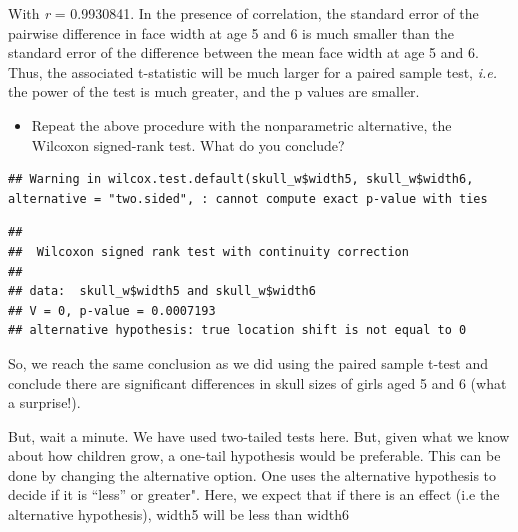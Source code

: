 \documentclass[
  12pt,
]{book}
\newenvironment{Shaded}{\begin{snugshade}}{\end{snugshade}}
\newcommand{\DataTypeTok}[1]{\textcolor[rgb]{0.13,0.29,0.53}{#1}}
\newcommand{\KeywordTok}[1]{\textcolor[rgb]{0.13,0.29,0.53}{\textbf{#1}}}
\newcommand{\NormalTok}[1]{#1}
\newcommand{\OperatorTok}[1]{\textcolor[rgb]{0.81,0.36,0.00}{\textbf{#1}}}
\newcommand{\OtherTok}[1]{\textcolor[rgb]{0.56,0.35,0.01}{#1}}
\newcommand{\StringTok}[1]{\textcolor[rgb]{0.31,0.60,0.02}{#1}}
\providecommand{\tightlist}{%
  \setlength{\itemsep}{0pt}\setlength{\parskip}{0pt}}
\begin{document}
With \emph{r} = 0.9930841. In the presence of correlation, the standard error of the pairwise difference in face width at age 5 and 6 is much smaller than the standard error of the difference between the mean face width at age 5 and 6. Thus, the associated t-statistic will be much larger for a paired sample test, \emph{i.e.} the power of the test is much greater, and the p values are smaller.

\begin{itemize}
\tightlist
\item
  Repeat the above procedure with the nonparametric alternative, the Wilcoxon signed-rank test. What do you conclude?
\end{itemize}

\begin{Shaded}
\end{Shaded}

\begin{verbatim}
## Warning in wilcox.test.default(skull_w$width5, skull_w$width6, alternative = "two.sided", : cannot compute exact p-value with ties
\end{verbatim}

\begin{verbatim}
## 
##  Wilcoxon signed rank test with continuity correction
## 
## data:  skull_w$width5 and skull_w$width6
## V = 0, p-value = 0.0007193
## alternative hypothesis: true location shift is not equal to 0
\end{verbatim}

So, we reach the same conclusion as we did using the paired sample t-test and conclude there are significant differences in skull sizes of girls aged 5 and 6 (what a surprise!).

But, wait a minute. We have used two-tailed tests here. But, given what we know about how children grow, a one-tail hypothesis would be preferable. This can be done by changing the alternative option. One uses the alternative hypothesis to decide if it is ``less'' or greater". Here, we expect that if there is an effect (i.e the alternative hypothesis), width5 will be less than width6

\begin{Shaded}
\end{Shaded}
\end{document}
